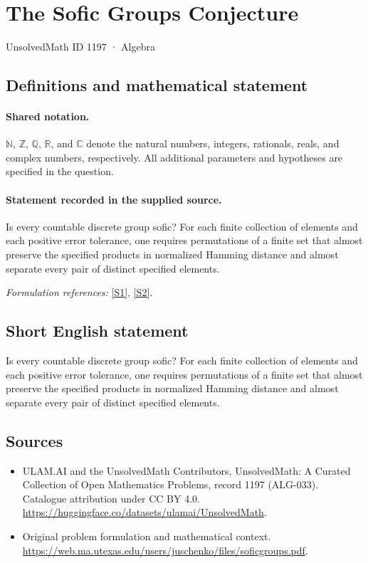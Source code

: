 \documentclass[11pt]{article}
\newcommand{\sref}[2]{\hyperlink{source:#1:#2}{[S#2]}}
\begin{document}
\setcounter{section}{1196}
\section{The Sofic Groups Conjecture}\label{1197}
{\small UnsolvedMath ID 1197 · Algebra}
\subsection{Definitions and mathematical statement}

\paragraph{Shared notation.}$\mathbb N$, $\mathbb Z$, $\mathbb Q$, $\mathbb R$, and $\mathbb C$ denote the natural numbers, integers, rationals, reals, and complex numbers, respectively. All additional parameters and hypotheses are specified in the question.


\paragraph{Statement recorded in the supplied source.}
Is every countable discrete group sofic? For each finite collection of elements and each positive error tolerance, one requires permutations of a finite set that almost preserve the specified products in normalized Hamming distance and almost separate every pair of distinct specified elements.
\par\smallskip\textit{Formulation references:} \sref{1197}{1}, \sref{1197}{2}.
\subsection{Short English statement}
Is every countable discrete group sofic? For each finite collection of elements and each positive error tolerance, one requires permutations of a finite set that almost preserve the specified products in normalized Hamming distance and almost separate every pair of distinct specified elements.
\subsection{Sources}
\begin{itemize}
\item[\hypertarget{source:1197:1}{S1}] ULAM.AI and the UnsolvedMath Contributors, UnsolvedMath: A Curated Collection of Open Mathematics Problems, record 1197 (ALG-033). Catalogue attribution under CC BY 4.0.
\url{https://huggingface.co/datasets/ulamai/UnsolvedMath}.
\item[\hypertarget{source:1197:2}{S2}] Original problem formulation and mathematical context.
\url{https://web.ma.utexas.edu/users/juschenko/files/soficgroups.pdf}.
\end{itemize}
\label{end:1197}
\end{document}
